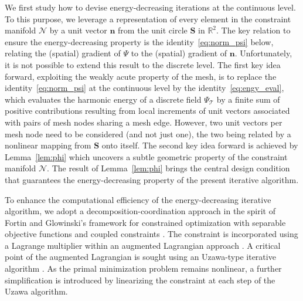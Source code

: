 \documentclass[a4paper,11pt]{article}
\theoremstyle{definition}
\theoremstyle{remark}
\numberwithin{equation}{section}
\newcommand{\Real}{\mathbb{R}}
\newcommand{\bn}{{\boldsymbol n}}
\newcommand{\bS}{{\boldsymbol S}}
\newcommand{\calN}{\mathcal{N}}
\newcommand{\calT}{\mathcal{T}}
\begin{document}
We first study how to devise energy-decreasing iterations at the continuous level. %
To this purpose, we leverage a representation of every element in the constraint manifold $\calN$ by a unit vector $\bn$ from the unit circle $\bS$ in $\Real^2$. The key relation to ensure the energy-decreasing property is the identity~\eqref{eq:norm_psi} below, relating the (spatial) gradient of $\Psi$ to the (spatial) gradient of $\bn$. 
Unfortunately, it is not possible to extend this result to the discrete level. The first key 
idea forward, exploiting the weakly acute property of the mesh, is to replace the identity~\eqref{eq:norm_psi} at the continuous level by the identity~\eqref{eq:engy_eval}, which evaluates the harmonic energy of a discrete field $\Psi_\calT$ by a finite sum of positive contributions resulting from local increments of unit vectors associated with pairs of mesh nodes sharing a mesh edge. However, two unit vectors per mesh node need to be considered (and not just one), the two being related by a nonlinear mapping from $\bS$ onto itself. The second key idea forward is achieved by Lemma~\ref{lem:phi} which uncovers a subtle geometric property of the constraint manifold $\calN$. The result of Lemma~\ref{lem:phi} brings the central design condition that guarantees the energy-decreasing property of the present iterative algorithm.  

To enhance the computational efficiency of the energy-decreasing iterative algorithm, we adopt a decomposition-coordination approach in the spirit of Fortin and Glowinski's framework for constrained optimization  with separable objective functions and coupled constraints \cite{Fortin:Glowinski:1983}.   The constraint is incorporated using a Lagrange multiplier within an augmented Lagrangian approach \cite{Bertsekas:1982,Bertsekas:1999}. A critical point of the augmented Lagrangian is sought using an Uzawa-type iterative algorithm  \cite{Arrow:Hurwicz:Uzawa:1958,Fortin:Glowinski:1983}.  As the primal minimization problem remains nonlinear, a further simplification is introduced by linearizing the constraint at each step of the Uzawa algorithm. 
\end{document}
